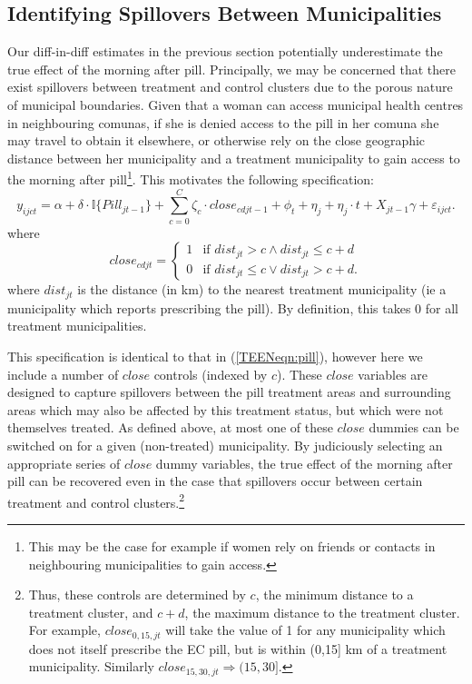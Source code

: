 \subsection{Identifying Spillovers Between Municipalities}
\label{TEENsscn:spilloverID}
Our diff-in-diff estimates in the previous section potentially underestimate the 
true effect of the morning after pill.  Principally, we may be concerned that
there exist spillovers between treatment and control clusters due to the porous
nature of municipal boundaries. Given that a woman can access municipal health
centres in neighbouring comunas, if she is denied access to the pill in her
comuna she may travel to obtain it elsewhere, or otherwise rely on the close
geographic distance between her municipality and a treatment municipality to 
gain access to the morning after pill\footnote{This may be the case for example
if women rely on friends or contacts in neighbouring municipalities to gain 
access.}.  This motivates the following specification:
\begin{equation}
 \label{TEENeqn:spillover}
y_{ijct} = \alpha + \delta\cdot \mathbb{I}\{Pill_{jt-1}\} + 
\sum_{c=0}^C\zeta_c\cdot close_{cdjt-1} + \phi_t + \eta_j + \eta_j\cdot t +
X_{jt-1}\gamma + \varepsilon_{ijct}.
\end{equation}
where
\[
 close_{cdjt} =
  \begin{cases}
   1 & \text{if } dist_{jt} > c \wedge dist_{jt}\leq c+d   \\
   0 & \text{if } dist_{jt} \leq c \vee  dist_{jt}>c+d.
  \end{cases}
\]
where $dist_{jt}$ is the distance (in km) to the nearest treatment municipality 
(ie a municipality which reports prescribing the pill).  By definition, this takes
0 for all treatment municipalities.

This specification is identical to that in (\ref{TEENeqn:pill}), however here we 
include a number of $close$ controls (indexed by $c$).  These $close$ variables are 
designed to capture spillovers between the pill treatment areas and surrounding 
areas which may also be affected by this treatment status, but which were not 
themselves treated.  As defined above, at most one of these $close$ dummies can
be switched on for a given (non-treated) municipality.  By judiciously selecting 
an appropriate series of $close$ dummy variables, the true effect of the morning 
after pill can be recovered even in the case that spillovers occur between 
certain treatment and control clusters.\footnote{Thus, these controls are 
determined by $c$, the minimum distance to a treatment cluster, and $c+d$, 
the maximum distance to the treatment cluster. For example, $close_{0,15,jt}$ 
will take the value of 1 for any municipality which does not itself prescribe 
the EC pill, but is within (0,15] km of a treatment municipality.  Similarly 
$close_{15,30,jt}\Rightarrow (15,30]$.}

